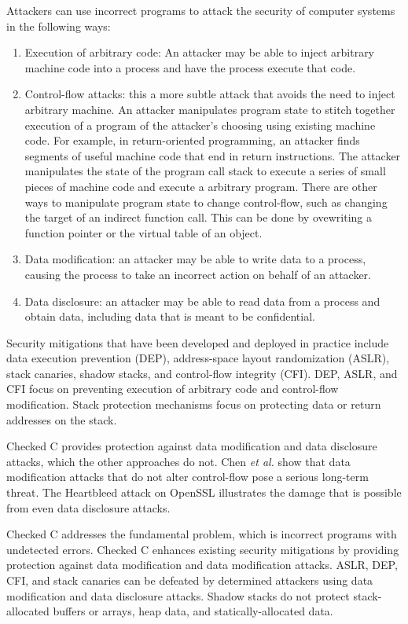 Attackers can use incorrect programs to attack the security of 
computer systems in the following ways:
\begin{enumerate}
\item  Execution of arbitrary code: An attacker may be able to inject arbitrary machine code into a process and have the process  execute that code.
\item Control-flow attacks: this a more subtle attack that avoids the need to inject arbitrary machine.  An attacker manipulates program state to
stitch together execution of a program of the attacker's choosing
using existing machine code.
For example, in return-oriented programming, an attacker finds segments of useful
machine code that end in return instructions. The attacker manipulates the state of 
the program call  stack to execute a series of small pieces of machine code and execute
a arbitrary program.  There are other ways to manipulate program state to
change control-flow, such as changing the target of an indirect function call.  
This can be done by 
ovewriting a function pointer or the virtual table of an object.
\item Data modification: an attacker may be able to write data to a process, causing the process to take an incorrect action on behalf of an attacker.
\item  Data disclosure: an attacker may be able to read data from a process 
and obtain data, including data that is meant to be confidential.  
\end{enumerate}

Security mitigations that have been developed and deployed in
practice include data execution prevention (DEP), 
address-space layout randomization (ASLR), stack canaries,
shadow stacks, and control-flow integrity (CFI).   DEP, ASLR, and CFI focus
on preventing execution of arbitrary code and control-flow modification.  
Stack protection mechanisms focus on protecting data or return addresses
on the stack. 

Checked C provides protection against data modification and
data disclosure attacks, which the other approaches do not.
Chen {\it et al.} \cite{Chen2005} show that data modification
attacks that do not alter control-flow pose a serious long-term threat.
The Heartbleed attack on OpenSSL illustrates the damage that is
possible from even data disclosure attacks.

Checked C addresses the fundamental problem, which is incorrect programs
with undetected errors. Checked C enhances existing security mitigations by
providing protection against data modification and data modification attacks.
ASLR, DEP, CFI, and stack canaries can be 
defeated by determined attackers using data modification and data disclosure
attacks.  Shadow stacks do not protect stack-allocated buffers or arrays, 
heap data, and statically-allocated data.

